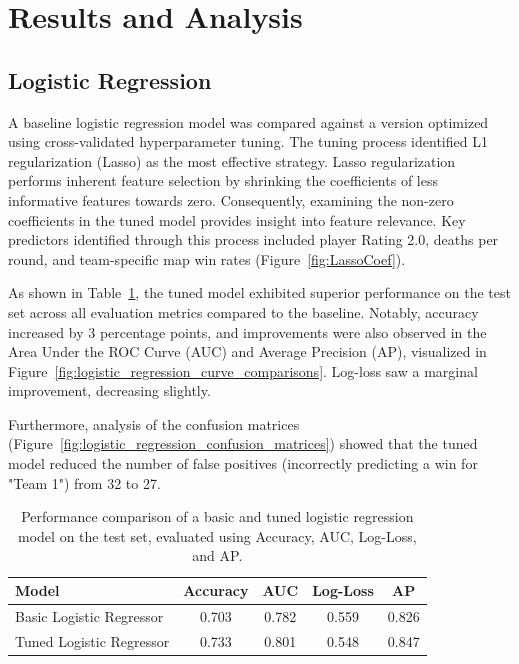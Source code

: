\documentclass[11pt]{article}
\begin{document}
\section{Results and Analysis}
\subsection{Logistic Regression}
A baseline logistic regression model was compared against a version optimized using cross-validated hyperparameter tuning. The tuning process identified L1 regularization (Lasso) as the most effective strategy. Lasso regularization performs inherent feature selection by shrinking the coefficients of less informative features towards zero. Consequently, examining the non-zero coefficients in the tuned model provides insight into feature relevance. Key predictors identified through this process included player Rating 2.0, deaths per round, and team-specific map win rates (Figure~\ref{fig:LassoCoef}).

As shown in Table~\ref{tab:logistic_regression_comparison_table}, the tuned model exhibited superior performance on the test set across all evaluation metrics compared to the baseline. Notably, accuracy increased by 3 percentage points, and improvements were also observed in the Area Under the ROC Curve (AUC) and Average Precision (AP), visualized in Figure~\ref{fig:logistic_regression_curve_comparisons}. Log-loss saw a marginal improvement, decreasing slightly.

Furthermore, analysis of the confusion matrices (Figure~\ref{fig:logistic_regression_confusion_matrices}) showed that the tuned model reduced the number of false positives (incorrectly predicting a win for "Team 1") from 32 to 27.

\begin{table}[H]
\centering
\begin{tabular}{lcccc}
\hline
\textbf{Model} & \textbf{Accuracy} & \textbf{AUC} & \textbf{Log-Loss} & \textbf{AP} \\
\hline
Basic Logistic Regressor       & 0.703 & 0.782 & 0.559 & 0.826 \\
Tuned Logistic Regressor       & 0.733 & 0.801 & 0.548 & 0.847 \\
\hline
\end{tabular}
\caption{Performance comparison of a basic and tuned logistic regression model on the test set, evaluated using Accuracy, AUC, Log-Loss, and AP.}
\label{tab:logistic_regression_comparison_table}
\end{table}
\end{document}
